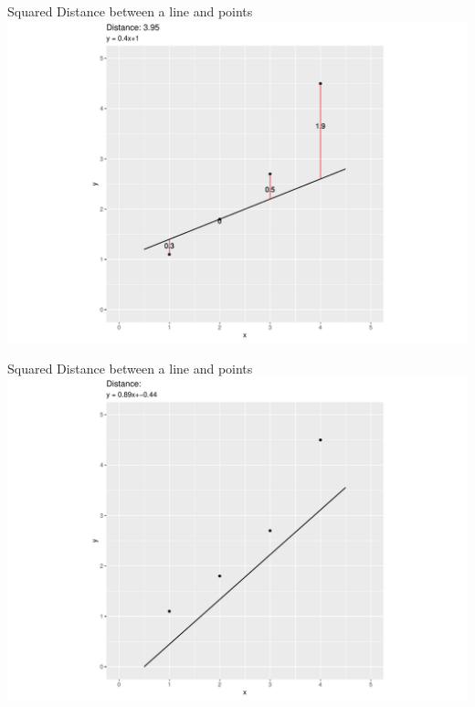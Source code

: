 \documentclass[
  ignorenonframetext,
]{beamer}
\begin{document}
\begin{frame}{Squared Distance between a line and points}
\protect\hypertarget{squared-distance-between-a-line-and-points-1}{}
\includegraphics{1_files/figure-beamer/unnamed-chunk-5-1.pdf}
\end{frame}

\begin{frame}{Squared Distance between a line and points}
\protect\hypertarget{squared-distance-between-a-line-and-points-2}{}
\includegraphics{1_files/figure-beamer/unnamed-chunk-6-1.pdf}
\end{frame}
\end{document}
